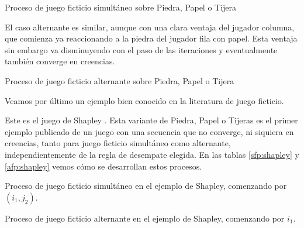 \begin{table} %
    \centering
    
    \caption{Proceso de juego ficticio simultáneo sobre Piedra, Papel o Tijera}
    \label{sfp:piedra:papel:tijera}
\end{table}

El caso alternante es similar, aunque con una clara ventaja del jugador columna, que comienza ya reaccionando a la piedra del jugador fila con papel. Esta ventaja sin embargo va disminuyendo con el paso de las iteraciones y eventualmente también converge en creencias.


\begin{table} %
    \centering
    
    \caption{Proceso de juego ficticio alternante sobre Piedra, Papel o Tijera}
    \label{afp:piedra:papel:tijera}
\end{table}

Veamos por último un ejemplo bien conocido en la literatura de juego ficticio.



Este es el juego de Shapley \cite{shapley:3x3}. Esta variante de Piedra, Papel o Tijeras es el primer ejemplo publicado de un juego con una secuencia que no converge, ni siquiera en creencias, tanto para juego ficticio simultáneo como alternante, independientemente de la regla de desempate elegida. En las tablas \ref{sfp:shapley} y \ref{afp:shapley} vemos cómo se desarrollan estos procesos.


\begin{table} %
    \centering
    
    \caption{Proceso de juego ficticio simultáneo en el ejemplo de Shapley, comenzando por $(i_1, j_2)$.}
    \label{sfp:shapley}
\end{table}
\begin{table} %
    \centering
    
    \caption{Proceso de juego ficticio alternante en el ejemplo de Shapley, comenzando por $i_1$.}
    \label{afp:shapley}
\end{table}

